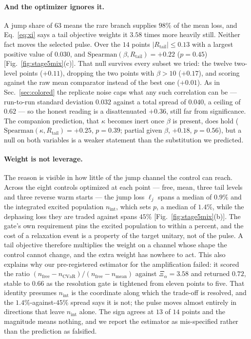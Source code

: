 \documentclass[aps,pra,twocolumn,superscriptaddress,reprint,nofootinbib,floatfix]{revtex4-2}
\theoremstyle{definition}
\newcommand{\cvar}{\mathrm{CVaR}}
\newcommand{\Rt}{R_{\mathrm{tail}}}
\begin{document}
\paragraph*{And the optimizer ignores it.} A jump share of $63$ means the
rare branch supplies $98\%$ of the mean loss, and Eq.~\eqref{eq:xi} says a
tail objective weights it $3.58$ times more heavily still. Neither fact moves
the selected pulse. Over the $14$ points $|\Rt|\le0.13$ with a largest
positive value of $0.030$, and $\mathrm{Spearman}(\beta,\Rt)=+0.22$ ($p=0.45$)
[Fig.~\ref{fig:stage5mix}(c)]. That null survives every subset we tried: the
twelve two-level points ($+0.11$), dropping the two points with $\beta>10$
($+0.17$), and scoring against the raw mean comparator instead of the best one
($+0.01$). As in Sec.~\ref{sec:colored} the replicate noise caps what any such
correlation can be --- run-to-run standard deviation $0.032$ against a total
spread of $0.040$, a ceiling of $0.62$ --- so the honest reading is a
disattenuated $+0.36$, still far from significance. The companion prediction,
that $\kappa$ becomes inert once $\beta$ is present, does hold
($\mathrm{Spearman}(\kappa,\Rt)=+0.25$, $p=0.39$; partial given $\beta$,
$+0.18$, $p=0.56$), but a null on both variables is a weaker statement than
the substitution we predicted.

\paragraph*{Weight is not leverage.} The reason is visible in how little of
the jump channel the control can reach. Across the eight controls optimized
at each point --- free, mean, three tail levels and three reverse warm starts
--- the jump loss $\ell_j$ spans a median of $0.9\%$ and the integrated
excited population $n_{\mathrm{int}}$, which sets $p$, a median of $1.4\%$,
while the dephasing loss they are traded against spans $45\%$
[Fig.~\ref{fig:stage5mix}(b)]. The gate's own requirement pins the excited
population to within a percent, and the cost of a relaxation event is a
property of the target unitary, not of the pulse. A tail objective therefore
multiplies the weight on a channel whose shape the control cannot change,
and the extra weight has nowhere to act. This also explains why our
pre-registered estimator for the amplification failed: it scored the ratio
$(n_{\mathrm{free}}-n_{\cvar})/(n_{\mathrm{free}}-n_{\mathrm{mean}})$ against
$\Xi_\alpha=3.58$ and returned $0.72$, stable to $0.66$ as the resolution gate
is tightened from eleven points to five. That identity presumes
$n_{\mathrm{int}}$ is the coordinate along which the trade-off is resolved,
and the $1.4\%$-against-$45\%$ spread says it is not; the pulse moves almost
entirely in directions that leave $n_{\mathrm{int}}$ alone. The sign agrees at
$13$ of $14$ points and the magnitude means nothing, and we report the
estimator as mis-specified rather than the prediction as falsified.
\end{document}
